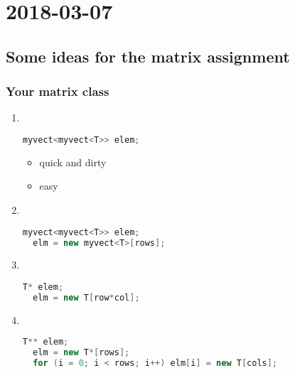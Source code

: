 \section{2018-03-07}

\subsection{Some ideas for the matrix assignment}

\subsubsection{Your matrix class}

\begin{enumerate}
  \item \ 
\begin{lstlisting}[language=C++]
  myvect<myvect<T>> elem;
\end{lstlisting}

    \begin{itemize}
      \item quick and dirty
      \item easy
    \end{itemize}

  \item \ 
\begin{lstlisting}[language=C++]
  myvect<myvect<T>> elem;
  elm = new myvect<T>[rows];
\end{lstlisting}

  \item \ 
\begin{lstlisting}[language=C++]
  T* elem;
  elm = new T[row*col];
\end{lstlisting}

  \item \ 
\begin{lstlisting}[language=C++]
  T** elem;
  elm = new T*[rows];
  for (i = 0; i < rows; i++) elm[i] = new T[cols];
\end{lstlisting}
\end{enumerate}